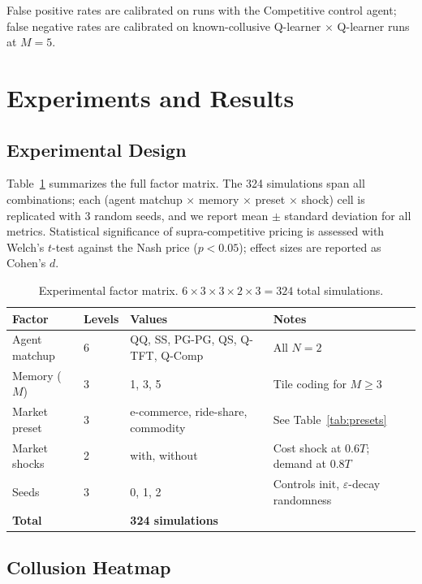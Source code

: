 \documentclass[11pt]{article}
\begin{document}
False positive rates are calibrated on runs with the Competitive control agent; false negative rates are calibrated on known-collusive Q-learner $\times$ Q-learner runs at $M = 5$.

\section{Experiments and Results}

\subsection{Experimental Design}

Table~\ref{tab:factors} summarizes the full factor matrix.
The 324 simulations span all combinations; each (agent matchup $\times$ memory $\times$ preset $\times$ shock) cell is replicated with 3 random seeds, and we report mean $\pm$ standard deviation for all metrics.
Statistical significance of supra-competitive pricing is assessed with Welch's $t$-test against the Nash price ($p < 0.05$); effect sizes are reported as Cohen's $d$.

\begin{table}[h]
\centering
\small
\caption{Experimental factor matrix. $6 \times 3 \times 3 \times 2 \times 3 = 324$ total simulations.}
\label{tab:factors}
\begin{tabular}{llll}
\toprule
\textbf{Factor} & \textbf{Levels} & \textbf{Values} & \textbf{Notes} \\
\midrule
Agent matchup & 6 & QQ, SS, PG-PG, QS, Q-TFT, Q-Comp & All $N=2$ \\
Memory ($M$) & 3 & 1, 3, 5 & Tile coding for $M \geq 3$ \\
Market preset & 3 & e-commerce, ride-share, commodity & See Table~\ref{tab:presets} \\
Market shocks & 2 & with, without & Cost shock at $0.6T$; demand at $0.8T$ \\
Seeds & 3 & 0, 1, 2 & Controls init, $\varepsilon$-decay randomness \\
\midrule
\textbf{Total} & & \textbf{324 simulations} & \\
\bottomrule
\end{tabular}
\end{table}

\subsection{Collusion Heatmap}
\end{document}
